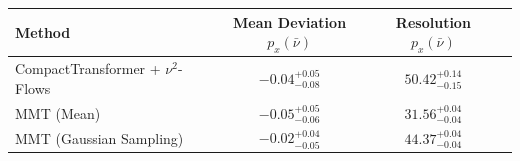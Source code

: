     \begin{tabular}{lccc}
        \toprule
        Method & Mean Deviation $p_{x}(\bar{\nu})$ & Resolution $p_{x}(\bar{\nu})$ \\
        \midrule
        CompactTransformer + $\nu^2$-Flows & $-0.04^{+0.05}_{-0.08}$ & $50.42^{+0.14}_{-0.15}$ \\
        MMT (Mean) & $-0.05^{+0.05}_{-0.06}$ & $31.56^{+0.04}_{-0.04}$ \\
        MMT (Gaussian Sampling) & $-0.02^{+0.04}_{-0.05}$ & $44.37^{+0.04}_{-0.04}$ \\
        \bottomrule
    \end{tabular}